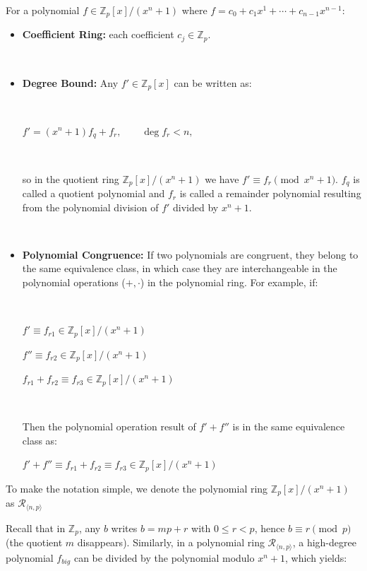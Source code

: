 \begin{tcolorbox}[title={\textbf{\tboxlabel{\ref*{subsec:poly-ring-overview}} Ring}}]

For a polynomial $f \in \mathbb{Z}_p[x] / (x^n + 1)$ where $f = c_0 + c_1x^1 + \cdots + c_{n-1}x^{n-1}$:

\begin{itemize}
\item \textbf{Coefficient Ring:} each coefficient $c_j \in \mathbb{Z}_p$.

$ $

\item \textbf{Degree Bound:} Any $f' \in \mathbb{Z}_p[x]$ can be written as:

$ $

$f'=(x^n+1)f_q+f_r,\qquad \deg f_r < n,$

$ $

so in the quotient ring $\mathbb{Z}_p[x]/(x^n+1)$ we have $f' \equiv f_r \pmod{x^n+1}$. $f_q$ is called a quotient polynomial and $f_r$ is called a remainder polynomial resulting from the polynomial division of $f'$ divided by $x^n + 1$.

$ $

\item \textbf{Polynomial Congruence:} If two polynomials are congruent, they belong to the same equivalence class, in which case they are interchangeable in the polynomial operations ($+, \cdot$) in the polynomial ring. For example, if: 

$ $

$f' \equiv f_{r1} \in \mathbb{Z}_p[x] / (x^n + 1)$

$f{''} \equiv f_{r2} \in \mathbb{Z}_p[x] / (x^n + 1)$

$f_{r1} + f_{r2} \equiv f_{r3} \in \mathbb{Z}_p[x] / (x^n + 1)$

$ $

Then the polynomial operation result of $f' + f''$ is in the same equivalence class as: 

$f' + f'' \equiv f_{r1} + f_{r2} \equiv f_{r3} \in \mathbb{Z}_p[x] / (x^n + 1)$


\end{itemize}

To make the notation simple, we denote the polynomial ring $\mathbb{Z}_p[x] / (x^n + 1)$ as $\mathcal{R}_{\langle n, p \rangle}$
\end{tcolorbox}

Recall that in $\mathbb{Z}_p$, any $b$ writes $b = mp + r$ with $0\le r<p$, hence $b \equiv r \pmod{p}$ (the quotient $m$ disappears). Similarly, in a polynomial ring $\mathcal{R}_{\langle n, p \rangle}$, a high-degree polynomial $f_{big}$ can be divided by the polynomial modulo $x^n + 1$, which yields:

